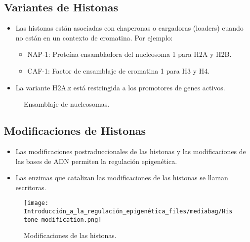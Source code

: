 \documentclass[
  letterpaper,
  DIV=11,
  numbers=noendperiod]{scrartcl}
\providecommand{\tightlist}{%
  \setlength{\itemsep}{0pt}\setlength{\parskip}{0pt}}\usepackage{longtable,booktabs,array}
\begin{document}
\subsection{Variantes de Histonas}\label{variantes-de-histonas-2}

\begin{itemize}
\tightlist
\item
  Las histonas están asociadas con chaperonas o cargadoras (loaders)
  cuando no están en un contexto de cromatina. Por ejemplo:

  \begin{itemize}
  \tightlist
  \item
    NAP-1: Proteína ensambladora del nucleosoma 1 para H2A y H2B.
  \item
    CAF-1: Factor de ensamblaje de cromatina 1 para H3 y H4.
  \end{itemize}
\item
  La variante H2A.z está restringida a los promotores de genes activos.
\end{itemize}

\begin{figure}[H]

{\centering 

}

\caption{Ensamblaje de nucleosomas.}

\end{figure}%

\subsection{Modificaciones de
Histonas}\label{modificaciones-de-histonas}

\begin{itemize}
\tightlist
\item
  Las modificaciones postraduccionales de las histonas y las
  modificaciones de las bases de ADN permiten la regulación epigenética.
\item
  Las enzimas que catalizan las modificaciones de las histonas se llaman
  escritoras.
\end{itemize}

\begin{figure}[H]

{\centering \texttt{[image: Introducción\_a\_la\_regulación\_epigenética\_files/mediabag/Histone\_modification.png]}

}

\caption{Modificaciones de las histonas.}

\end{figure}%
\end{document}
